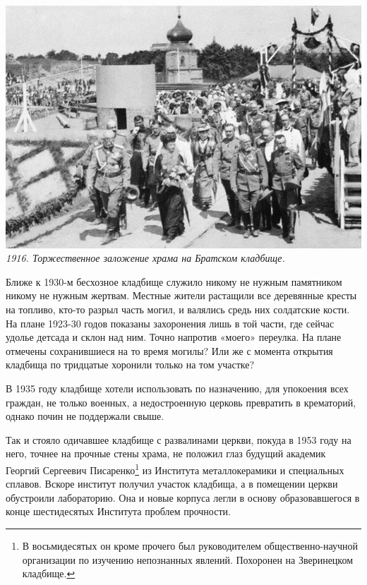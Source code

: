 \begin{center}
\includegraphics[width=\textwidth]{chast-vosp/zver/brat-zakl.jpg}
\textit{1916. Торжественное заложение храма на Братском кладбище.}
\end{center}

Ближе к 1930-м бесхозное кладбище служило никому не нужным памятником никому не нужным жертвам. Местные жители растащили все деревянные кресты на топливо, кто-то разрыл часть могил, и валялись средь них солдатские кости. На плане 1923-30 годов показаны захоронения лишь в той части, где сейчас удолье детсада и склон над ним. Точно напротив «моего» переулка. На плане отмечены сохранившиеся на то время могилы? Или же с момента открытия кладбища по тридцатые хоронили только на том участке?



В 1935 году кладбище хотели использовать по назначению, для упокоения всех граждан, не только военных, а недостроенную церковь превратить в крематорий, однако почин не поддержали свыше.

Так и стояло одичавшее кладбище с развалинами церкви, покуда в 1953 году на него, точнее на прочные стены храма, не положил глаз будущий академик Георгий Сергеевич Писаренко\footnote{В восьмидесятых он кроме прочего был руководителем общественно-научной организации по изучению непознанных явлений. Похоронен на Зверинецком кладбище.} из Института металлокерамики и специальных сплавов. Вскоре институт получил участок кладбища, а в помещении церкви обустроили лабораторию. Она и новые корпуса легли в основу образовавшегося в конце шестидесятых Института проблем прочности.

